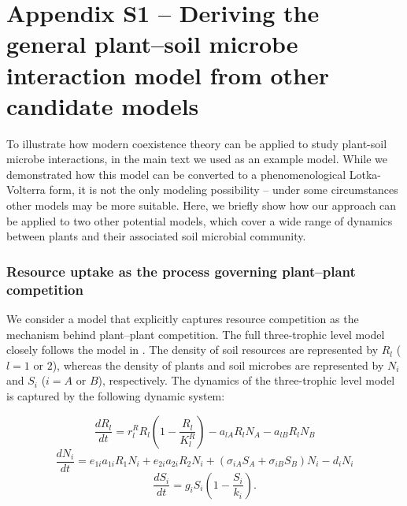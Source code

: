 \section{Appendix S1 -- Deriving the general plant--soil microbe interaction model from other candidate models}
To illustrate how modern coexistence theory can be applied to study plant-soil microbe interactions, in the main text we used \citet{Eppinga2006} as an example model. While we demonstrated how this model can be converted to a phenomenological Lotka-Volterra form, it is not the only modeling possibility -- under some circumstances other models may be more suitable. Here, we briefly show how our approach can be applied to two other potential models, which cover a wide range of dynamics between plants and their associated soil microbial community.
\par


\subsubsection*{Resource uptake as the process governing plant--plant competition}
We consider a model that explicitly captures resource competition as the mechanism behind plant--plant competition. The full three-trophic level model closely follows the model in \citet{Chesson2008b}. The density of soil resources are represented by $R_{l}$ ($l=1$ or $2$), whereas the density of plants and soil microbes are represented by $N_{i}$ and $S_{i}$ ($i=A$ or $B$), respectively. The dynamics of the three-trophic level model is captured by the following dynamic system:

\begin{equation}
\frac{dR_{l}}{dt} = r_{l}^{R} R_{l} \left ( 1 - \frac{R_{l} }{K_{l}^{R}} \right ) - a_{lA}R_{l}N_{A}  - a_{lB}R_{l}N_{B}
\tag{S4.1}\label{eq:Resource_RCmodel}
\end{equation}
\begin{equation}
\frac{dN_{i}}{dt} = e_{1i}a_{1i}R_{1}N_{i}  + e_{2i}a_{2i}R_{2}N_{i} + \left( \sigma_{iA}S_{A}+\sigma_{iB}S_{B} \right)N_{i} - d_{i}N_{i}
\tag{S4.2}\label{eq:Plant_RCmodel}
\end{equation}
\begin{equation}
\frac{dS_{i}}{dt } = g_{i}S_{i}\left ( 1-\frac{S_{i}}{k_{i}}\right ) .
\tag{S4.3}\label{eq:Soil_RCmodel}
\end{equation}

